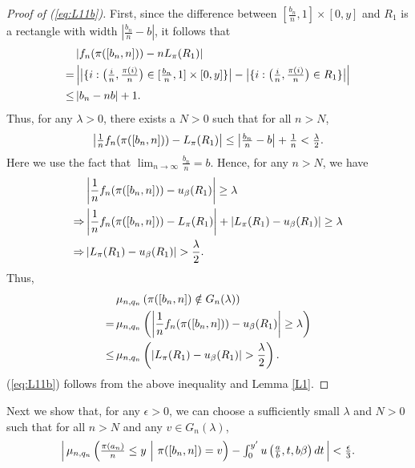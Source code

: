 \begin{proof}[Proof of (\ref{eq:L11b})]
First, since the difference between $[\frac{b_n}{n}, 1] \times [0, y]$ and $R_1$ is a rectangle with width $\left| \frac{b_n}{n} - b \right|$, it follows that
\begin{align*}
  &\left| f_n(\pi([b_n, n])) - n L_{\pi}(R_1) \right|\\
 =& \textstyle\left| \big|\{ i : \big( \frac{i}{n}, \frac{\pi(i)}{n} \big) \in [\frac{b_n}{n}, 1] \times [0, y] \} \big| -
    \big| \{ i : \big( \frac{i}{n}, \frac{\pi(i)}{n} \big) \in R_1 \} \big|\right|\\
 \le&\, |b_n - n b| +1.
\end{align*}
Thus, for any $\lambda > 0$, there exists a $N >0$ such that for all $n > N$,
\[
\textstyle\left| \frac{1}{n} f_n(\pi([b_n, n])) - L_{\pi}(R_1) \right| \le \left| \frac{b_n}{n} - b \right| + \frac{1}{n} < \frac{\lambda}{2}.
\]
Here we use the fact that $\lim_{n \to \infty} \frac{b_n}{n} = b$.
Hence, for any $n > N$, we have
\begin{align*}
  & \left|\frac{1}{n} f_n(\pi([b_n, n])) - u_{\beta}(R_1) \right| \ge \lambda\\
 \Rightarrow & \left| \frac{1}{n} f_n(\pi([b_n, n])) - L_{\pi}(R_1) \right| + \left| L_{\pi}(R_1) - u_{\beta}(R_1) \right| \ge \lambda\\
 \Rightarrow & \left| L_{\pi}(R_1) - u_{\beta}(R_1) \right| > \frac{\lambda}{2}.
\end{align*}
Thus,
\begin{align*}
 & \, \mu_{n, q_n} \left( \pi([b_n, n]) \notin G_n(\lambda) \right) \\
=& \, \mu_{n, q_n} \left( \left|\frac{1}{n} f_n(\pi([b_n, n])) - u_{\beta}(R_1) \right| \ge \lambda \right) \\
\le& \, \mu_{n, q_n} \left( \left| L_{\pi}(R_1) - u_{\beta}(R_1) \right| > \frac{\lambda}{2} \right).
\end{align*}
(\ref{eq:L11b}) follows from the above inequality and Lemma \ref{L1}.
\end{proof}


Next we show that, for any $\epsilon > 0$, we can choose a sufficiently small $\lambda$ and $N >0$ such that for all $ n > N $ and any
$v \in G_n(\lambda)$,
\begin{equation}
\textstyle\left|\, \mu_{n, q_n} \left( \frac{\pi(a_n)}{n} \le y \ \middle|\  \pi([b_n, n]) = v \right) -
\int_{0}^{y'} u\left(\frac{a}{b}, t, b \beta\right)dt \,\right| < \frac{\epsilon}{3}. \label{eq:L11c}
\end{equation}



